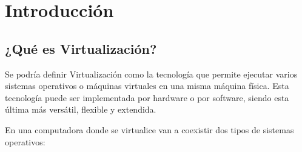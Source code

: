 \date{\normalsize\today} %



	
	
	\maketitle %
	
	\newpage %
	
	\tableofcontents %
	
	
	
	
	\newpage
	
	
	\chapter{Introducción}
	
	\section{¿Qué es Virtualización?}
	
	Se podría definir Virtualización como la tecnología que permite ejecutar varios sistemas operativos o máquinas virtuales en una misma máquina física. Esta tecnología puede ser implementada por hardware o por software, siendo esta última más versátil, flexible y extendida. \cite{1} \newline
	
	En una computadora donde se virtualice van a coexistir dos tipos de sistemas operativos:
	
